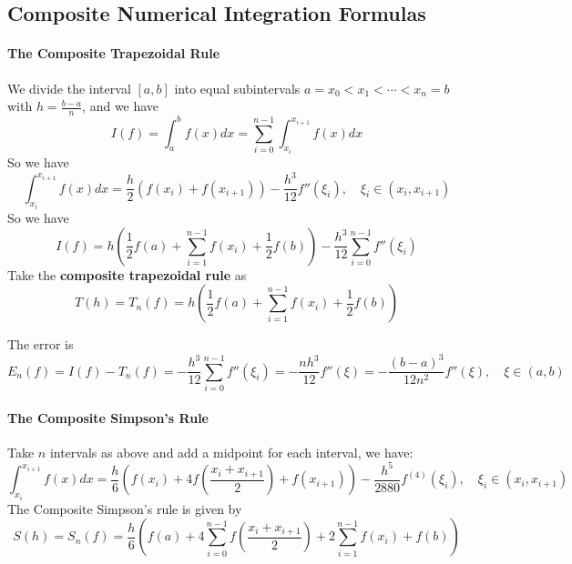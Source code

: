 \documentclass{matharticle}
\begin{document}
\subsection{Composite Numerical Integration Formulas}

\paragraph{The Composite Trapezoidal Rule}
We divide the interval $[a, b]$ into equal subintervals $a = x_0 < x_1 < \cdots < x_n = b$ with $h = \frac{b - a}{n}$, and we have
\begin{equation}
	I(f) = \int_{a}^{b} f(x) dx = \sum_{i=0}^{n-1} \int_{x_i}^{x_{i+1}} f(x) dx
\end{equation}
So we have
\begin{equation*}
	\int_{x_i}^{x_{i+1}} f(x) dx = \frac{h}{2} (f(x_i) + f(x_{i+1})) - \frac{h^3}{12} f''(\xi_i), \quad \xi_i \in (x_i, x_{i+1})
\end{equation*}
So we have
\begin{equation}
	I(f) = h \left( \frac{1}{2} f(a) + \sum_{i=1}^{n-1} f(x_i) + \frac{1}{2} f(b) \right) - \frac{h^3}{12} \sum_{i=0}^{n-1} f''(\xi_i)
\end{equation}
Take the \textbf{composite trapezoidal rule} as
\begin{equation}
	T(h) = T_n(f) = h \left( \frac{1}{2} f(a) + \sum_{i=1}^{n-1} f(x_i) + \frac{1}{2} f(b) \right)
\end{equation}

The error is
\begin{equation}
	E_n(f) = I(f) - T_n(f) = -\frac{h^3}{12} \sum_{i=0}^{n-1} f''(\xi_i) = -\frac{n h^3}{12} f''(\xi) = -\frac{(b - a)^3}{12 n^2} f''(\xi), \quad \xi \in (a, b)
\end{equation}

\paragraph{The Composite Simpson's Rule}
Take $n$ intervals as above and add a midpoint for each interval, we have:
\begin{equation*}
	\int_{x_i}^{x_{i+1}} f(x) dx = \frac{h}{6} (f(x_i) + 4 f(\frac{x_i + x_{i+1}}{2}) + f(x_{i+1})) - \frac{h^5}{2880} f^{(4)}(\xi_i), \quad \xi_i \in (x_i, x_{i+1})
\end{equation*}
The Composite Simpson's rule is given by
\begin{equation}
	S(h) = S_n(f) = \frac{h}{6} \left( f(a) + 4 \sum_{i=0}^{n-1} f(\frac{x_i + x_{i+1}}{2}) + 2 \sum_{i=1}^{n-1} f(x_i) + f(b) \right)
\end{equation}
\end{document}
